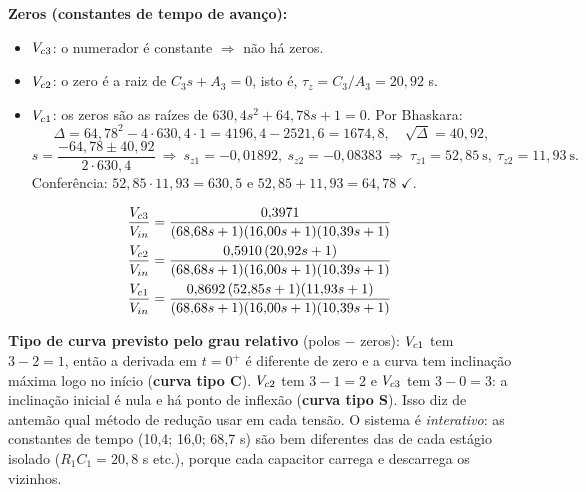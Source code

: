 \textbf{Zeros (constantes de tempo de avanço):}
\begin{itemize}
\item $V_{c3}$: o numerador é constante $\Rightarrow$ não há zeros.
\item $V_{c2}$: o zero é a raiz de $C_3s+A_3=0$, isto é, $\tau_z=C_3/A_3=20{,}92$ s.
\item $V_{c1}$: os zeros são as raízes de $630{,}4s^2+64{,}78s+1=0$. Por Bhaskara:
\[
\Delta=64{,}78^2-4\cdot630{,}4\cdot1=4196{,}4-2521{,}6=1674{,}8,\quad\sqrt\Delta=40{,}92,
\]
\[
s=\frac{-64{,}78\pm40{,}92}{2\cdot630{,}4}\ \Rightarrow\ s_{z1}=-0{,}01892,\ s_{z2}=-0{,}08383\ \Rightarrow\ \tau_{z1}=52{,}85\ \mathrm{s},\ \tau_{z2}=11{,}93\ \mathrm{s}.
\]
Conferência: $52{,}85\cdot11{,}93=630{,}5$ e $52{,}85+11{,}93=64{,}78$ $\checkmark$.
\end{itemize}
\begin{res}
\begin{align}
\frac{V_{c3}}{V_{in}}&=\frac{0{,}3971}{(68{,}68s+1)(16{,}00s+1)(10{,}39s+1)}\label{ft3}\\
\frac{V_{c2}}{V_{in}}&=\frac{0{,}5910\,(20{,}92s+1)}{(68{,}68s+1)(16{,}00s+1)(10{,}39s+1)}\\
\frac{V_{c1}}{V_{in}}&=\frac{0{,}8692\,(52{,}85s+1)(11{,}93s+1)}{(68{,}68s+1)(16{,}00s+1)(10{,}39s+1)}
\end{align}
\end{res}
\begin{just}\textbf{Tipo de curva previsto pelo grau relativo} (polos $-$ zeros): $V_{c1}$ tem $3-2=1$, então a derivada em $t=0^+$ é diferente de zero e a curva tem inclinação máxima logo no início (\textbf{curva tipo C}). $V_{c2}$ tem $3-1=2$ e $V_{c3}$ tem $3-0=3$: a inclinação inicial é nula e há ponto de inflexão (\textbf{curva tipo S}). Isso diz de antemão qual método de redução usar em cada tensão. O sistema é \emph{interativo}: as constantes de tempo (10,4; 16,0; 68,7 s) são bem diferentes das de cada estágio isolado ($R_1C_1=20{,}8$ s etc.), porque cada capacitor carrega e descarrega os vizinhos.\end{just}

